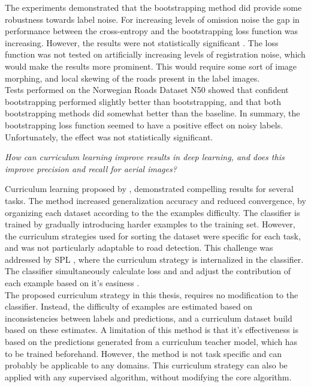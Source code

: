 The experiments demonstrated that the bootstrapping method did provide some robustness towards label noise. For increasing levels of omission noise the gap in performance between the cross-entropy and the bootstrapping loss function was increasing. However, the results were not statistically significant . The loss function was not tested on artificially increasing levels of registration noise, which would make the results more prominent. This would require some sort of image morphing, and local skewing of the roads present in the label images. \\

Tests performed on the Norwegian Roads Dataset N50 showed that confident bootstrapping performed slightly better than bootstrapping, and that both bootstrapping methods did somewhat better than the baseline. In summary, the bootstrapping loss function seemed to have a positive effect on noisy labels. Unfortunately, the effect was not statistically significant. 

\begin{description}[ style=nextline, leftmargin=1.5em, rightmargin=1.5em]
\item[Research question 2:]{\it How can curriculum learning improve results in deep learning, and does this improve precision and recall for aerial images?}
\end{description}

Curriculum learning proposed by \cite{Bengio_curriculumlearning}, demonstrated compelling results for several tasks. The method increased generalization accuracy and reduced convergence, by organizing each dataset according to the the examples difficulty. The classifier is trained by gradually introducing harder examples to the training set. However, the curriculum strategies used for sorting the dataset were specific for each task, and was not particularly adaptable to road detection. This challenge was addressed by \ac{SPL} \citep{Kumar_self_paced_learning}, where the curriculum strategy is internalized in the classifier. The classifier simultaneously calculate loss and and adjust the contribution of each example based on it's easiness  .\\

The proposed curriculum strategy in this thesis, requires no modification to the classifier. Instead, the difficulty of examples are estimated based on inconsistencies between labels and predictions, and a curriculum dataset build based on these estimates. A limitation of this method is that it's effectiveness is based on the predictions generated from a curriculum teacher model, which has to be trained beforehand. However, the method is not task specific and can probably be applicable to any domains. This curriculum strategy can also be applied with any supervised algorithm, without modifying the core algorithm. \\

